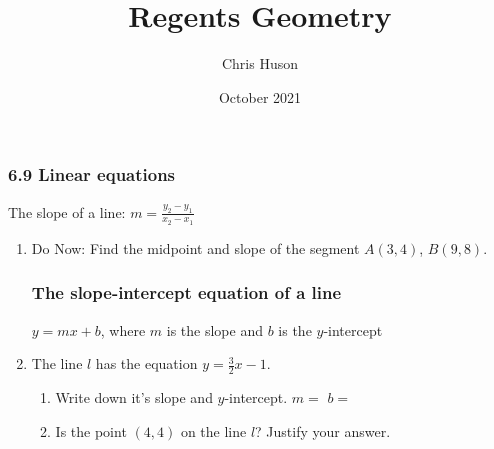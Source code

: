 \documentclass[12pt, twoside]{article}
\title{Regents Geometry}
\author{Chris Huson}
\date{October 2021}
\begin{document}
\subsubsection*{6.9 Linear equations}
The slope of a line: $\displaystyle m=\frac{y_2-y_1}{x_2-x_1}$
\begin{enumerate}
\item Do Now: Find the midpoint and slope of the segment $A(3,4)$, $B(9,8)$.
\begin{flushleft}
  \end{flushleft}

\subsubsection*{The slope-intercept equation of a line}
$y=mx+b$, where $m$ is the slope and $b$ is the $y$-intercept
\item The line $l$ has the equation $y=\frac{3}{2}x-1$. 
\begin{enumerate}
  \item Write down it's slope and $y$-intercept. \hspace{2cm} $m=$
  \hspace{2cm} $b=$
  \item Is the point $(4, 4)$ on the line $l$? Justify your answer.
\end{enumerate}
\vspace{2cm}


\end{enumerate}
\end{document}
